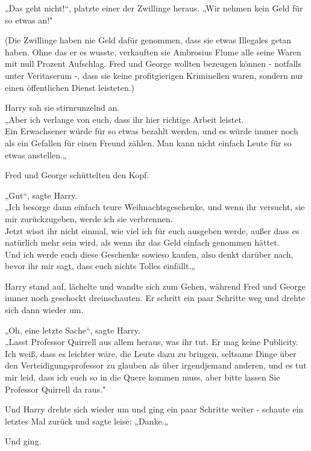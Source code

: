 {„Das geht nicht!“, platzte einer der Zwillinge heraus. „Wir nehmen kein Geld für so etwas an!"

(Die Zwillinge haben nie Geld dafür genommen, dass sie etwas Illegales getan haben. Ohne das er es wusste, verkauften sie Ambrosius Flume alle seine Waren mit null Prozent Aufschlag. Fred und George wollten bezeugen können - notfalls unter Veritaserum -, dass sie keine profitgierigen Kriminellen waren, sondern nur einen öffentlichen Dienst leisteten.)

Harry sah sie stirnrunzelnd an.\\ „Aber ich verlange von euch, dass ihr hier richtige Arbeit leistet.\\ Ein Erwachsener würde für so etwas bezahlt werden, und es würde immer noch als ein Gefallen für einen Freund zählen. Man kann nicht einfach Leute für so etwas anstellen.„

Fred und George schüttelten den Kopf.

„Gut“, sagte Harry.\\ „Ich besorge dann einfach teure Weihnachtsgeschenke, und wenn ihr versucht, sie mir zurückzugeben, werde ich sie verbrennen.\\ Jetzt wisst ihr nicht einmal, wie viel ich für euch ausgeben werde, außer dass es natürlich mehr sein wird, als wenn ihr das Geld einfach genommen hättet.\\ Und ich werde euch diese Geschenke sowieso kaufen, also denkt darüber nach, bevor ihr mir sagt, dass euch nichts Tolles einfällt.„

Harry stand auf, lächelte und wandte sich zum Gehen, während Fred und George immer noch geschockt dreinschauten. Er schritt ein paar Schritte weg und drehte sich dann wieder um.

„Oh, eine letzte Sache“, sagte Harry.\\ „Lasst Professor Quirrell aus allem heraus, was ihr tut. Er mag keine Publicity. Ich weiß, dass es leichter wäre, die Leute dazu zu bringen, seltsame Dinge über den Verteidigungsprofessor zu glauben als über irgendjemand anderen, und es tut mir leid, dass ich euch so in die Quere kommen muss, aber bitte lassen Sie Professor Quirrell da raus."

Und Harry drehte sich wieder um und ging ein paar Schritte weiter - schaute ein letztes Mal zurück und sagte leise: „Danke.„

Und ging.

}
